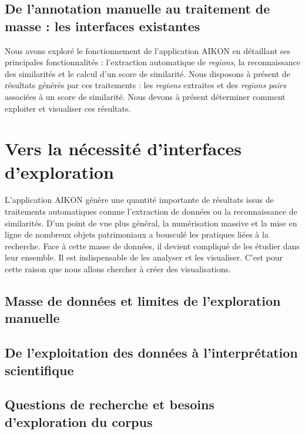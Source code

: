 \documentclass[a4paper,12pt,twoside]{book}
\newcommand{\clearemptydoublepage}{\newpage{\pagestyle{empty}\cleardoublepage}}
\begin{document}
	\section[Les interfaces existantes]{De l'annotation manuelle au traitement de masse : les interfaces existantes}
	
	
	
	Nous avons exploré le fonctionnement de l'application AIKON en détaillant ses principales fonctionnalités : l'extraction automatique de \textit{regions}, la reconnaissance des similarités et le calcul d'un score de similarité. Nous disposons à présent de résultats générés par ces traitements : les \textit{regions} extraites et des \textit{regions pairs} associées à un score de similarité. Nous devons à présent déterminer comment exploiter et visualiser ces résultats.
	
	\clearemptydoublepage
	
	\chapter{Vers la nécessité d'interfaces d'exploration}
	
	L'application AIKON génère une quantité importante de résultats issus de traitements automatiques comme l'extraction de données ou la reconnaissance de similarités. D'un point de vue plus général, la numérisation massive et la mise en ligne de nombreux objets patrimoniaux a bousculé les pratiques liées à la recherche. Face à cette masse de données, il devient compliqué de les étudier dans leur ensemble. Il est indispensable de les analyser et les visualiser. C'est pour cette raison que nous allons chercher à créer des visualisations. 
	
	\section{Masse de données et limites de l'exploration manuelle}
	
	
	
	
	\section{De l'exploitation des données à l'interprétation scientifique}
	
	
	\section[Les besoins d'exploration du corpus]{Questions de recherche et besoins d'exploration du corpus}
	
	
\end{document}
